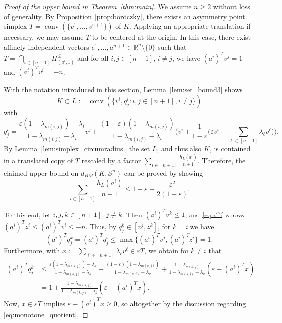 \documentclass{amsart}
\newcommand\R{\mathbb{R}}
\DeclareMathOperator{\conv}{conv}
\newcommand{\simplex}[1]{\mathcal{S}^{#1}}
\begin{document}
\begin{proof}[Proof of the upper bound in Theorem~\ref{thm:main}]
We assume $n \geq 2$ without loss of generality.
By Proposition~\ref{prop:böröczky}, there exists an asymmetry point simplex $T = \conv(\{ v^1, \dots, v^{n+1} \})$ of $K$. Applying an appropriate translation if necessary,
we may assume $T$ to be centered at the origin.
In this case, there exist affinely independent vectors $a^1, \dots, a^{n+1} \in \R^n \setminus \{0\}$ such that $T = \bigcap_{i \in [n+1]} H_{(a^i,1)}^\leq$
and for all $i,j \in [n+1]$, $i \neq j$, we have $(a^i)^T v^j = 1$ and $(a^i)^T v^i = -n$.


With the notation introduced in this section,
Lemma~\ref{lem:set_bound3} shows
\[
	K
	\subset L
	:= \conv(\{ v^i, q^i_j : i,j \in [n+1], i \neq j \})
\]
with
\[
	q^i_j = \frac{\varepsilon (1 - \lambda_{m(i,j)}) - \lambda_i}{1 - \lambda_{m(i,j)} - \lambda_i} v^j + \frac{(1 - \varepsilon) (1 - \lambda_{m(i,j)})}{1 - \lambda_{m(i,j)} - \lambda_i} \Bigg( v^i + \frac{1}{1 - \varepsilon} \Bigg( \varepsilon v^i - \sum_{\ell \in [n+1]} \lambda_\ell v^\ell \Bigg) \Bigg).
\]
By Lemma~\ref{lem:simplex_circumradius},
the set $L$, and thus also $K$, is contained in a translated copy of $T$ rescaled by a factor $\sum_{i \in [n+1]} \frac{h_L(a^i)}{n+1}$.
Therefore, the claimed upper bound on $d_{BM}(K,\simplex{n})$ can be proved by showing
\begin{equation}\label{eq:support_ineq}
	\sum_{i \in [n+1]} \frac{h_L(a^i)}{n+1}
		\leq 1 + \varepsilon + \frac{\varepsilon^2}{2 (1 - \varepsilon)}.
\end{equation}

To this end, let $i,j,k \in [n+1]$, $j \neq k$.
Then $(a^i)^T v^k \leq 1$,
and \eqref{eq:z^i} shows $(a^i)^T z^i \leq (a^i)^T v^i \leq -n$.
Thus, by $q^k_j \in [v^j,z^k]$, for $k = i$ we have
\[
	(a^i)^T q^k_j
    = (a^i)^T q^i_j
    \leq \max \{ (a^i)^T v^j, (a^i)^T z^i \}
    = 1.
\]
Furthermore, with $x := \sum_{\ell \in [n+1]} \lambda_\ell v^\ell \in \varepsilon T$, we obtain for $k \neq i$ that
\begin{align*}
	(a^i)^T q^k_j
	& \leq \frac{\varepsilon (1 - \lambda_{m(k,j)}) - \lambda_k}{1 - \lambda_{m(k,j)} - \lambda_k} + \frac{(1 - \varepsilon) (1 - \lambda_{m(k,j)})}{1 - \lambda_{m(k,j)} - \lambda_k} + \frac{1 - \lambda_{m(k,j)}}{1 - \lambda_{m(k,j)} - \lambda_k} ( \varepsilon - (a^i)^T x )
    \\
	& = 1 + \frac{1 - \lambda_{m(k,j)}}{1 - \lambda_{m(k,j)} - \lambda_k} ( \varepsilon - (a^i)^T x ).
\end{align*}
Now, $x \in \varepsilon T$ implies $\varepsilon - (a^i)^T x \geq 0$,
so altogether by the discussion regarding \eqref{eq:monotone_quotient},


\end{proof}
\end{document}

